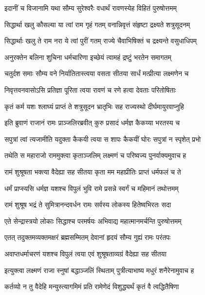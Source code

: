 \twolineshloka
{इदानीं च विजानामि यथा सौम्य सुरेश्वरैः}
{वधार्थं रावणस्येह विहितं पुरुषोत्तमम्} %

\twolineshloka
{सिद्धार्था खलु कौसल्या या त्वां राम गृहं गतम्}
{वनान्निवृत्तं संहृष्टा द्रक्ष्यते शत्रुसूदनम्} %

\twolineshloka
{सिद्धार्थाः खलु ते राम नरा ये त्वां पुरीं गतम्}
{राज्ये चैवाभिषिक्तं च द्रक्ष्यन्ते वसुधाधिपम्} %

\twolineshloka
{अनुरक्तेन बलिना शुचिना धर्मचारिणा}
{इच्छेयं त्वामहं द्रष्टुं भरतेन समागतम्} %

\twolineshloka
{चतुर्दश समाः सौम्य वने निर्यातितास्त्वया}
{वसता सीतया सार्धं मत्प्रीत्या लक्ष्मणेन च} %

\twolineshloka
{निवृत्तवनवासोऽसि प्रतिज्ञा पूरिता त्वया}
{रावणं च रणे हत्वा देवताः परितोषिताः} %

\twolineshloka
{कृतं कर्म यशः श्लाघ्यं प्राप्तं ते शत्रुसूदन}
{भ्रातृभिः सह राज्यस्थो दीर्घमायुरवाप्नुहि} %

\twolineshloka
{इति ब्रुवाणं राजानं रामः प्राञ्जलिरब्रवीत्}
{कुरु प्रसादं धर्मज्ञ कैकय्या भरतस्य च} %

\twolineshloka
{सपुत्रां त्वां त्यजामीति यदुक्ता कैकयी त्वया}
{स शापः कैकयीं घोरः सपुत्रां न स्पृशेत् प्रभो} %

\twolineshloka
{तथेति स महाराजो राममुक्त्वा कृताञ्जलिम्}
{लक्ष्मणं च परिष्वज्य पुनर्वाक्यमुवाच ह} %

\twolineshloka
{रामं शुश्रूषता भक्त्या वैदेह्या सह सीतया}
{कृता मम महाप्रीतिः प्राप्तं धर्मफलं च ते} %

\twolineshloka
{धर्मं प्राप्स्यसि धर्मज्ञ यशश्च विपुलं भुवि}
{रामे प्रसन्ने स्वर्गं च महिमानं तथोत्तमम्} %

\twolineshloka
{रामं शुश्रूष भद्रं ते सुमित्रानन्दवर्धन}
{रामः सर्वस्य लोकस्य हितेष्वभिरतः सदा} %

\twolineshloka
{एते सेन्द्रास्त्रयो लोकाः सिद्धाश्च परमर्षयः}
{अभिवाद्य महात्मानमर्चन्ति पुरुषोत्तमम्} %

\twolineshloka
{एतत् तदुक्तमव्यक्तमक्षरं ब्रह्मसम्मितम्}
{देवानां हृदयं सौम्य गुह्यं रामः परंतपः} %

\twolineshloka
{अवाप्तधर्माचरणं यशश्च विपुलं त्वया}
{एवं शुश्रूषताव्यग्रं वैदेह्या सह सीतया} %

\twolineshloka
{इत्युक्त्वा लक्ष्मणं राजा स्नुषां बद्धाञ्जलिं स्थिताम्}
{पुत्रीत्याभाष्य मधुरं शनैरेनामुवाच ह} %

\twolineshloka
{कर्तव्यो न तु वैदेहि मन्युस्त्यागमिमं प्रति}
{रामेणेदं विशुद्ध्यर्थं कृतं वै त्वद्धितैषिणा} %

